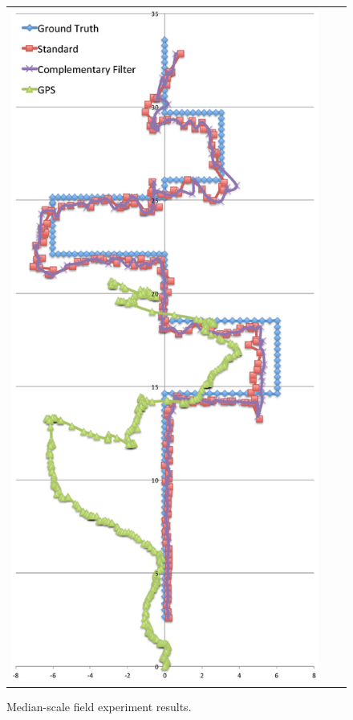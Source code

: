 \begin{figure}[th!]
\begin{center}
\begin{tabular}[t]{ccc}
\begin{minipage}[t]{0.3\textwidth}
      \includegraphics[width=\textwidth]{fig/median-scale-chart.eps}
      \caption{Median-scale field experiment results.}\label{fg-median-scale-chart}
    \end{minipage}
  \end{tabular}
\end{center}
\end{figure}

